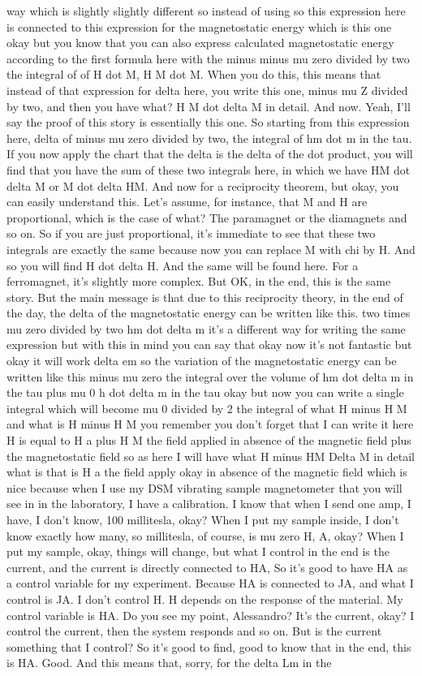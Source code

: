 way which is slightly slightly different so instead of using so this expression here is connected to this expression for the magnetostatic energy which is this one okay but you know that you can also express calculated magnetostatic energy according to the first formula here with the minus minus mu zero divided by two the integral of of H dot M, H M dot M. When you do this, this means that instead of that expression for delta here, you write this one, minus mu Z divided by two, and then you have what? H M dot delta M in detail. And now. Yeah, I'll say the proof of this story is essentially this one. So starting from this expression here, delta of minus mu zero divided by two, the integral of hm dot m in the tau. If you now apply the chart that the delta is the delta of the dot product, you will find that you have the sum of these two integrals here, in which we have HM dot delta M or M dot delta HM. And now for a reciprocity theorem, but okay, you can easily understand this. Let's assume, for instance, that M and H are proportional, which is the case of what? The paramagnet or the diamagnets and so on. So if you are just proportional, it's immediate to see that these two integrals are exactly the same because now you can replace M with chi by H. And so you will find H dot delta H. And the same will be found here. For a ferromagnet, it's slightly more complex. But OK, in the end, this is the same story. But the main message is that due to this reciprocity theory, in the end of the day, the delta of the magnetostatic energy can be written like this. two times mu zero divided by two hm dot delta m it's a different way for writing the same expression but with this in mind you can say that okay now it's not fantastic but okay it will work delta em so the variation of the magnetostatic energy can be written like this minus mu zero the integral over the volume of hm dot delta m in the tau plus mu 0 h dot delta m in the tau okay but now you can write a single integral which will become mu 0 divided by 2 the integral of what H minus H M and what is H minus H M you remember you don't forget that I can write it here H is equal to H a plus H M the field applied in absence of the magnetic field plus the magnetostatic field so as here I will have what H minus HM Delta M in detail what is that is H a the field apply okay in absence of the magnetic field which is nice because when I use my DSM vibrating sample magnetometer that you will see in in the laboratory, I have a calibration. I know that when I send one amp, I have, I don't know, 100 millitesla, okay? When I put my sample inside, I don't know exactly how many, so millitesla, of course, is mu zero H, A, okay? When I put my sample, okay, things will change, but what I control in the end is the current, and the current is directly connected to HA, So it's good to have HA as a control variable for my experiment. Because HA is connected to JA, and what I control is JA. I don't control H. H depends on the response of the material. My control variable is HA. Do you see my point, Alessandro? It's the current, okay? I control the current, then the system responds and so on. But is the current something that I control? So it's good to find, good to know that in the end, this is HA. Good. And this means that, sorry, for the delta Lm in the 